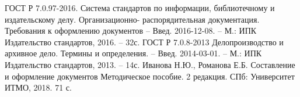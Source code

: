 \documentclass[utf8x, 12pt]{G7-32}
\begin{document}




\begin{thebibliography}{9}
	 ГОСТ Р 7.0.97-2016. Система стандартов по информации, библиотечному и издательскому делу. Организационно- распорядительная документация. Требования к оформлению документов – Введ. 2016-12-08. – М.: ИПК Издательство стандартов, 2016. – 32с.
	 ГОСТ Р 7.0.8-2013 Делопроизводство и архивное дело. Термины и определения. – Введ. 2014-03-01. – М.: ИПК Издательство стандартов, 2013. – 14с.
	 Иванова Н.Ю., Романова Е.Б. Составление и оформление документов Методическое пособие. 2 редакция. СПб: Университет ИТМО, 2018. 71 с.

\end{thebibliography}
\end{document}
